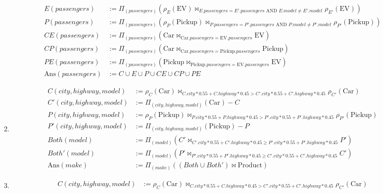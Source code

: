 \documentclass[12pt,letterpaper]{article}
\newcommand{\parens}[1]{\left(#1\right)}
\newcommand{\Ans}[0]{\text{Ans}}
\newcommand{\Car}[0]{\text{Car}}
\newcommand{\EV}[0]{\text{EV}}
\newcommand{\Pickup}[0]{\text{Pickup}}
\newcommand{\Product}[0]{\text{Product}}
\newcommand{\AND}[0]{\text{ AND }}
\begin{document}
\begin{enumerate}
\begin{enumerate}
\begin{align*}
            E(passengers) &:= \Pi_{\parens{passengers}}\parens{\rho_E\parens{\EV} \bowtie_{E.passengers = E'.passengers \AND E.model \ne E'.model} \rho_{E'}\parens{\EV}} \\
            P(passengers) &:= \Pi_{\parens{passengers}}\parens{\rho_P\parens{\Pickup} \bowtie_{P.passengers = P'.passengers \AND P.model \ne P'.model} \rho_{P'}\parens{\Pickup}} \\
            CE(passengers) &:= \Pi_{\parens{passengers}}\parens{\Car \bowtie_{\Car.passengers = \EV.passengers} \EV} \\
            CP(passengers) &:= \Pi_{\parens{passengers}}\parens{\Car \bowtie_{\Car.passengers = \Pickup.passengers} \Pickup} \\
            PE(passengers) &:= \Pi_{\parens{passengers}}\parens{\Pickup \bowtie_{\Pickup.passengers = \EV.passengers} \EV} \\
            \Ans(passengers) &:= C \cup E \cup P \cup CE \cup CP \cup PE
          \end{align*}
        \item
          \begin{align*}
            C(city, highway, model) &:= \rho_C\parens{\Car} \bowtie_{C.city * 0.55 + C.highway * 0.45 > C'.city * 0.55 + C'.highway * 0.45} \rho_{C'}\parens{\Car} \\
            C'(city, highway, model) &:= \Pi_{\parens{city, highway, model}}\parens{\Car} - C \\
            P(city, highway, model) &:= \rho_P\parens{\Pickup} \bowtie_{P.city * 0.55 + P.highway * 0.45 > P'.city * 0.55 + P'.highway * 0.45} \rho_{P'}\parens{\Pickup} \\
            P'(city, highway, model) &:= \Pi_{\parens{city, highway, model}}\parens{\Pickup} - P \\
            Both(model) &:= \Pi_{\parens{model}}\parens{C' \bowtie_{C'.city * 0.55 + C'.highway * 0.45 \ge P'.city * 0.55 + P'.highway * 0.45} P'} \\
            Both'(model) &:= \Pi_{\parens{model}}\parens{P' \bowtie_{P'.city * 0.55 + P'.highway * 0.45 \ge C'.city * 0.55 + C'.highway * 0.45} C'} \\
            \Ans(make) &:= \Pi_{\parens{make}}\parens{\parens{Both \cup Both'} \bowtie \Product}
          \end{align*}
        \item
          \begin{align*}
            C(city, highway, model) &:= \rho_C\parens{\Car} \bowtie_{C.city * 0.55 + C.highway * 0.45 > C'.city * 0.55 + C'.highway * 0.45} \rho_{C'}\parens{\Car} \\

\end{align*}
\end{enumerate}
\end{enumerate}
\end{document}
